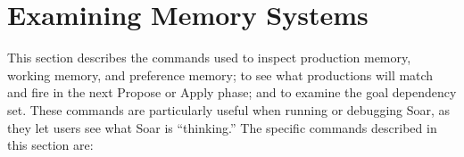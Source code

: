 \divider 
 
\divider
 
\divider

\divider 

\divider 

\divider 


\section{Examining Memory Systems}
\label{MEMORY}

This section describes the commands used to inspect production memory,
working memory, and preference memory; to see what productions will 
match and fire in the next Propose or Apply phase;  and to examine the 
goal dependency set.  These commands are particularly useful when
running or debugging Soar, as they let users see what Soar is ``thinking.''
The specific commands described in this section are:

